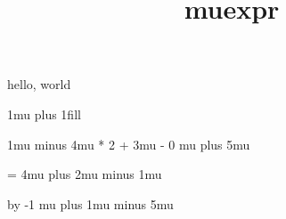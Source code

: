 \documentclass{amsart}
\title{muexpr}
\begin{document}
\maketitle

hello, world

\the \muexpr 1mu plus 1fill

\the \muexpr 1mu minus 4mu * 2 + 3mu - 0 mu plus 5mu


 = 4mu plus 2mu minus 1mu

\the{}

\advance{} by -1 mu plus 1mu minus 5mu

\the{}
\end{document}
